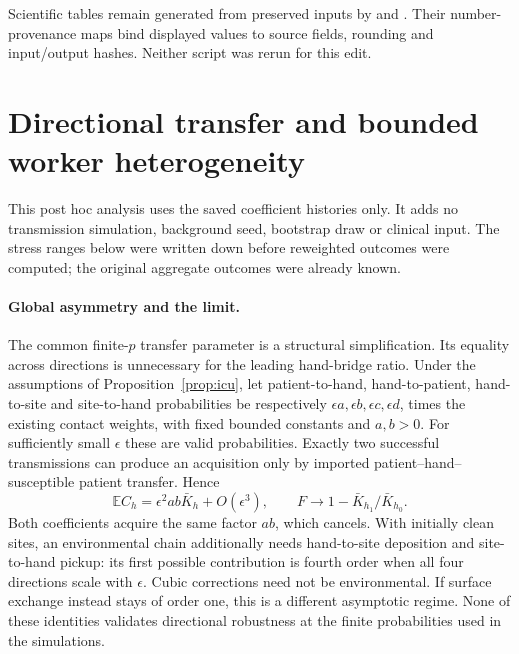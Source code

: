 \documentclass[11pt]{article}
\newcommand{\E}{\mathbb E}
\begin{document}
Scientific tables remain generated from preserved inputs by
 and
. Their number-provenance maps
bind displayed values to source fields, rounding and input/output hashes.
Neither script was rerun for this edit.

\section{Directional transfer and bounded worker heterogeneity}\label{sec:s-directional}
This post hoc analysis uses the saved coefficient histories only. It adds no
transmission simulation, background seed, bootstrap draw or clinical input.
The stress ranges below were written down before reweighted outcomes were
computed; the original aggregate outcomes were already known.

\paragraph{Global asymmetry and the limit.}
The common finite-$p$ transfer parameter is a structural simplification. Its
equality across directions is unnecessary for the leading hand-bridge ratio.
Under the assumptions of Proposition~\ref{prop:icu}, let patient-to-hand,
hand-to-patient, hand-to-site and site-to-hand probabilities be respectively
$\epsilon a,\epsilon b,\epsilon c,\epsilon d$, times the existing contact
weights, with fixed bounded constants and $a,b>0$. For sufficiently small
$\epsilon$ these are valid probabilities. Exactly two successful transmissions
can produce an acquisition only by imported patient--hand--susceptible patient
transfer. Hence
\[
\E C_h=\epsilon^2ab\bar K_h+O(\epsilon^3),\qquad
F\longrightarrow1-\bar K_{h_1}/\bar K_{h_0}.
\]
Both coefficients acquire the same factor $ab$, which cancels. With initially
clean sites, an environmental chain additionally needs hand-to-site deposition
and site-to-hand pickup: its first possible contribution is fourth order when
all four directions scale with $\epsilon$. Cubic corrections need not be
environmental. If surface exchange instead stays of order one, this is a
different asymptotic regime. None of these identities validates directional
robustness at the finite probabilities used in the simulations.
\end{document}
